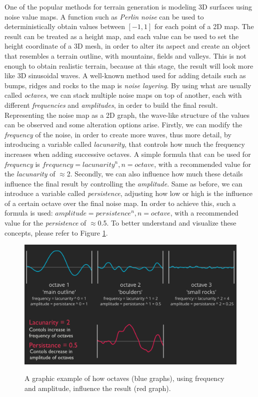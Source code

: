 One of the popular methods for terrain generation is modeling 3D surfaces using noise value maps. A function such as \textit{Perlin noise} can be used to deterministically obtain values between \([-1, 1]\) for each point of a 2D map. The result can be treated as a height map, and each value can be used to set the height coordinate of a 3D mesh, in order to alter its aspect and create an object that resembles a terrain outline, with mountains, fields and valleys. This is not enough to obtain realistic terrain, because at this stage, the result will look more like 3D sinusoidal waves. A well-known method used for adding details such as bumps, ridges and rocks to the map is \textit{noise layering}. By using what are usually called \textit{octaves}, we can stack multiple noise maps on top of another, each with different \textit{frequencies} and \textit{amplitudes}, in order to build the final result. Representing the noise map as a 2D graph, the wave-like structure of the values can be observed and some alteration options arise. Firstly, we can modify the \textit{frequency} of the noise, in order to create more waves, thus more detail, by introducing a variable called \textit{lacunarity}, that controls how much the frequency increases when adding successive octaves. A simple formula that can be used for \textit{frequency} is \(frequency=lacunarity^n, n=octave\), with a recommended value for the \textit{lacunarity} of $\approx$2. Secondly, we can also influence how much these details influence the final result by controlling the \textit{amplitude}. Same as before, we can introduce a variable called \textit{persistence}, adjusting how low or high is the influence of a certain octave over the final noise map. In order to achieve this, such a formula is used: \(amplitude = persistence^n, n=octave\), with a recommended value for the \textit{persistence} of $\approx$0.5. To better understand and visualize these concepts, please refer to Figure \ref{fig:terrainGraph}.\\

\begin{figure}[htp]
    \centering
    \includegraphics[width = 16cm]{figures/terrainGraph.png}
    \caption{A graphic example of how octaves (blue graphs), using frequency and amplitude, influence the result (red graph).}
    \cite{procGenIntro}
    \label{fig:terrainGraph}
\end{figure}

